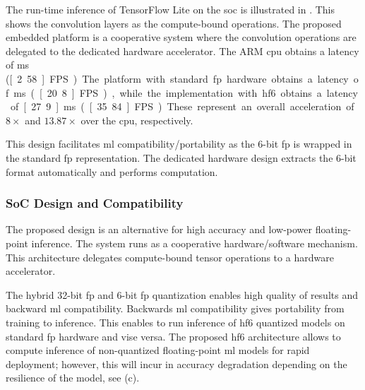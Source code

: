 The run-time inference of TensorFlow Lite on the \gls{soc} is illustrated in . This shows the convolution layers as the compute-bound operations. The proposed embedded platform is a cooperative system where the convolution operations are delegated to the dedicated hardware accelerator. The ARM \gls{cpu} obtains a latency of \unit[387]{ms} (\unit[2.58]{FPS}). The platform with standard \gls{fp} hardware obtains a latency of \unit[48]{ms} (\unit[20.8]{FPS}), while the implementation with \gls{hf6} obtains a latency of \unit[27.9]{ms} (\unit[35.84]{FPS}). These represent an overall acceleration of $8\times$ and $13.87\times$ over the \gls{cpu}, respectively.

This design facilitates \gls{ml} compatibility/portability as the 6-bit \gls{fp} is wrapped in the standard \gls{fp} representation. The dedicated hardware design extracts the 6-bit format automatically and performs computation.

\subsubsection{SoC Design and Compatibility}
The proposed design is an alternative for high accuracy and low-power floating-point inference. The system runs as a cooperative hardware/software mechanism. This architecture delegates compute-bound tensor operations to a hardware accelerator.

The hybrid 32-bit \gls{fp} and 6-bit \gls{fp} quantization enables high quality of results and backward \gls{ml} compatibility. Backwards \gls{ml} compatibility gives portability from training to inference. This enables to run inference of \gls{hf6} quantized models on standard \gls{fp} hardware and vise versa. The proposed \gls{hf6} architecture allows to compute inference of non-quantized floating-point \gls{ml} models for rapid deployment; however, this will incur in accuracy degradation depending on the resilience of the model, see (c).

